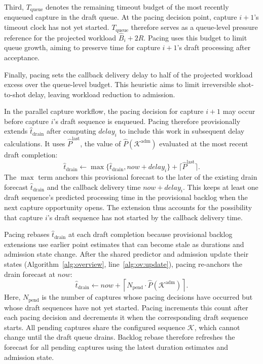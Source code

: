Third, \(T_{\mathrm{queue}}\) denotes the remaining timeout budget of the most recently enqueued capture in the draft queue.
At the pacing decision point, capture \(i+1\)'s timeout clock has not yet started.
\(T_{\mathrm{queue}}\) therefore serves as a queue-level pressure reference for the projected workload \(\hat B_i+2\hat R\).
Pacing uses this budget to limit queue growth, aiming to preserve time for capture \(i+1\)'s draft processing after acceptance.

Finally, pacing sets the callback delivery delay to half of the projected workload excess over the queue-level budget.
This heuristic aims to limit irreversible shot-to-shot delay, leaving workload reduction to admission.

In the parallel capture workflow, the pacing decision for capture \(i+1\) may occur before capture \(i\)'s draft sequence is enqueued.
Pacing therefore provisionally extends \(\hat t_{\mathrm{drain}}\) after computing \(\mathit{delay}_i\) to include this work in subsequent delay calculations.
It uses \(\hat P^{\mathrm{last}}\), the value of \(\hat P(\mathcal K^{\mathrm{adm}})\) evaluated at the most recent draft completion:
\begin{equation}
  \hat t_{\mathrm{drain}}
  \gets
  \max\{\hat t_{\mathrm{drain}},\mathit{now}+\mathit{delay}_i\}
  +\lceil\hat P^{\mathrm{last}}\rceil.
  \label{eq:clock-update}
\end{equation}
The \(\max\) term anchors this provisional forecast to the later of the existing drain forecast \(\hat t_{\mathrm{drain}}\) and the callback delivery time \(\mathit{now}+\mathit{delay}_i\).
This keeps at least one draft sequence's predicted processing time in the provisional backlog when the next capture opportunity opens.
The extension thus accounts for the possibility that capture \(i\)'s draft sequence has not started by the callback delivery time.

Pacing rebases \(\hat t_{\mathrm{drain}}\) at each draft completion because provisional backlog extensions use earlier point estimates that can become stale as durations and admission state change.
After the shared predictor and admission update their states (Algorithm~\ref{alg:overview}, line~\ref{alg:ov:update}), pacing re-anchors the drain forecast at \(\mathit{now}\):
\begin{equation}
  \hat t_{\mathrm{drain}}
  \gets
  \mathit{now}
  +\left\lceil
    N_{\mathrm{pend}}\cdot\hat P(\mathcal K^{\mathrm{adm}})
  \right\rceil.
  \label{eq:clock-rebase}
\end{equation}
Here, \(N_{\mathrm{pend}}\) is the number of captures whose pacing decisions have occurred but whose draft sequences have not yet started.
Pacing increments this count after each pacing decision and decrements it when the corresponding draft sequence starts.
All pending captures share the configured sequence \(\mathcal K\), which cannot change until the draft queue drains.
Backlog rebase therefore refreshes the forecast for all pending captures using the latest duration estimates and admission state.
